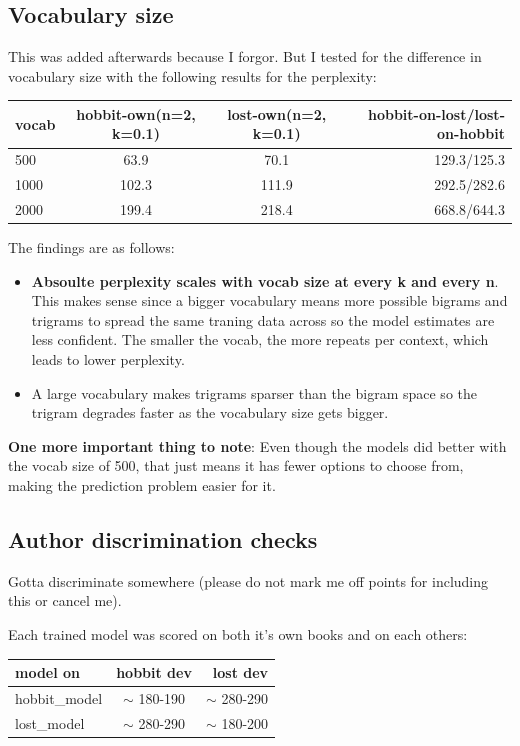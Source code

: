 \documentclass[11pt]{article}
\begin{document}
\subsection{Vocabulary size}

This was added afterwards because I forgor. But I tested for the difference in vocabulary size with the following results for the perplexity:

\begin{tabular}{lccr}
  vocab & hobbit-own(n=2, k=0.1) & lost-own(n=2, k=0.1) & hobbit-on-lost/lost-on-hobbit \\
  \hline
  500 & 63.9 & 70.1 & 129.3/125.3 \\
  1000 & 102.3 & 111.9 & 292.5/282.6 \\
  2000 & 199.4 & 218.4 & 668.8/644.3
\end{tabular}

The findings are as follows:

\begin{itemize}
  \item
        \textbf{Absoulte perplexity scales with vocab size at every k and every n}. This makes sense since a bigger vocabulary means more possible bigrams and trigrams to spread the same traning data across so the model estimates are less confident. The smaller the vocab, the more repeats per context, which leads to lower perplexity.
  \item
        A large vocabulary makes trigrams sparser than the bigram space so the trigram degrades faster as the vocabulary size gets bigger.
\end{itemize}

\textbf{One more important thing to note}: Even though the models did better with the vocab size of 500, that just means it has fewer options to choose from, making the prediction problem easier for it.

\subsection{Author discrimination checks}

Gotta discriminate somewhere (please do not mark me off points for including this or cancel me).

Each trained model was scored on both it's own books and on each others:


\begin{tabular}[center]{lcr}
  model on & hobbit dev & lost dev \\
  \hline
  hobbit\_model & $\sim$ 180-190 & $\sim$ 280-290 \\
  lost\_model & $\sim$ 280-290 & $\sim$ 180-200 \\
\end{tabular}
\end{document}
